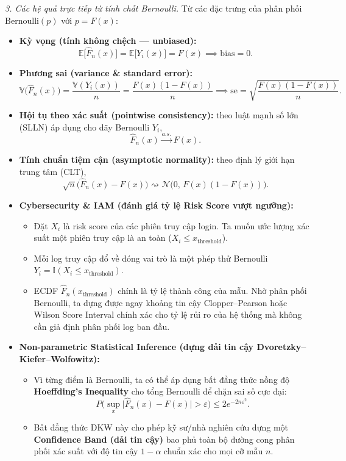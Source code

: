 \textit{3. Các hệ quả trực tiếp từ tính chất Bernoulli.} Từ các đặc trưng của phân phối $\mathrm{Bernoulli}(p)$ với $p=F(x)$:
\begin{itemize}
\item \textbf{Kỳ vọng (tính không chệch --- unbiased):}
\[ \mathbb{E}\big[\widehat F_n(x)\big]=\mathbb{E}\big[Y_i(x)\big]=F(x)\implies \mathrm{bias}=0. \]
\item \textbf{Phương sai (variance \& standard error):}
\[ \mathbb{V}\big(\widehat F_n(x)\big)=\frac{\mathbb{V}(Y_i(x))}{n}=\frac{F(x)(1-F(x))}{n}\implies \mathrm{se}=\sqrt{\frac{F(x)(1-F(x))}{n}}. \]
\item \textbf{Hội tụ theo xác suất (pointwise consistency):} theo luật mạnh số lớn (SLLN) áp dụng cho dãy Bernoulli $Y_i$,
\[ \widehat F_n(x)\xrightarrow{a.s.}F(x). \]
\item \textbf{Tính chuẩn tiệm cận (asymptotic normality):} theo định lý giới hạn trung tâm (CLT),
\[ \sqrt{n}\big(\widehat F_n(x)-F(x)\big)\rightsquigarrow\mathcal{N}\big(0,\,F(x)(1-F(x))\big). \]
\end{itemize}

\begin{itemize}
\item \textbf{Cybersecurity \& IAM (đánh giá tỷ lệ Risk Score vượt ngưỡng):}
  \begin{itemize}
  \item Đặt $X_i$ là risk score của các phiên truy cập login. Ta muốn ước lượng xác suất một phiên truy cập là an toàn ($X_i\le x_{\text{threshold}}$).
  \item Mỗi log truy cập đổ về đóng vai trò là một phép thử Bernoulli $Y_i=\mathbb{I}(X_i\le x_{\text{threshold}})$.
  \item ECDF $\widehat F_n(x_{\text{threshold}})$ chính là tỷ lệ thành công của mẫu. Nhờ phân phối Bernoulli, ta dựng được ngay khoảng tin cậy Clopper--Pearson hoặc Wilson Score Interval chính xác cho tỷ lệ rủi ro của hệ thống mà không cần giả định phân phối log ban đầu.
  \end{itemize}
\item \textbf{Non-parametric Statistical Inference (dựng dải tin cậy Dvoretzky--Kiefer--Wolfowitz):}
  \begin{itemize}
  \item Vì từng điểm là Bernoulli, ta có thể áp dụng bất đẳng thức nồng độ \textbf{Hoeffding's Inequality} cho tổng Bernoulli để chặn sai số cực đại:
  \[ P\Big(\sup_{x}\big|\widehat F_n(x)-F(x)\big|>\varepsilon\Big)\le 2e^{-2n\varepsilon^{2}}. \]
  \item Bất đẳng thức DKW này cho phép kỹ sư/nhà nghiên cứu dựng một \textbf{Confidence Band (dải tin cậy)} bao phủ toàn bộ đường cong phân phối xác suất với độ tin cậy $1-\alpha$ chuẩn xác cho mọi cỡ mẫu $n$.
  \end{itemize}
\end{itemize}

